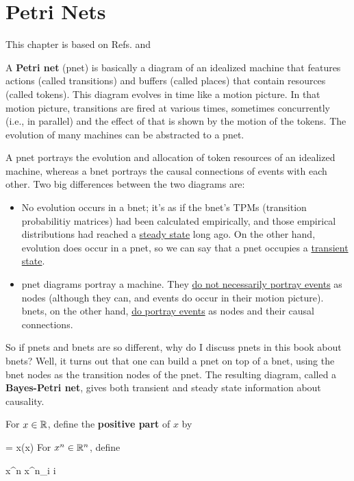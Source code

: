 \chapter{Petri Nets}
\label{ch-petri}

This chapter
is based on Refs.\cite{wiki-pnet} and \cite{tucci-bayes-petri}

A {\bf Petri net} (pnet)
is basically a diagram of an 
idealized machine that 
features actions (called transitions)
and
buffers (called places)
that contain resources (called tokens).
This diagram evolves in time like a motion picture.  In that motion picture, transitions are fired at various times, sometimes concurrently (i.e., in parallel) and the effect of that is shown  by the motion of the tokens. The evolution of many
 machines can be abstracted
to a pnet.

A pnet  portrays the evolution and allocation of token resources of
an idealized machine, whereas 
a bnet 
portrays the causal connections of events with each other. 
Two big differences between the two diagrams  are:

\begin{itemize}
\item No evolution occurs in a bnet; it's as if the
bnet's TPMs (transition probabilitiy matrices) had been calculated empirically, and those empirical distributions
had reached a \ul{steady state} long ago.
On the other hand, evolution does occur in a pnet, so
we can say that a pnet  occupies a \ul{ transient state}.
\item pnet diagrams portray a machine. They \ul{do not necessarily portray events} as nodes (although they can, and events do occur in their motion picture). bnets, on the
other hand,  \ul{do portray  events} as nodes and
their causal connections.

\end{itemize}

So if pnets and bnets are so different,
why do I discuss pnets in this book
about bnets? Well,
it turns out that one can build a pnet
on top of a bnet, using the bnet nodes
as the transition nodes of the pnet. The 
resulting diagram,
called  a {\bf Bayes-Petri net},
gives both transient and steady state 
information about causality.

For $x\in { \mathbb{R}}$, define
the {\bf positive part} of $x$ by

\beq
{} = x\indi(x)
\eeq
For $x^n\in{ \mathbb{R}}^n$, define

\beq
x^n \;\;\;\;
x^n_i \;\;\forall i
\eeq

